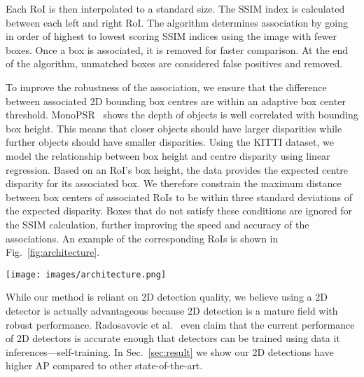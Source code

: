 \documentclass[letterpaper, 10 pt, conference]{ieeeconf}
\begin{document}
Each RoI is then interpolated to a standard size. The SSIM index is calculated between each left and right RoI. The algorithm determines association by going in order of highest to lowest scoring SSIM indices using the image with fewer boxes. Once a box is associated, it is removed for faster comparison. At the end of the algorithm, unmatched boxes are considered false positives and removed.

To improve the robustness of the association, we ensure that the difference between associated 2D bounding box centres are within an adaptive box center threshold. MonoPSR~\cite{ku2019monopsr} shows the depth of objects is well correlated with bounding box height. This means that closer objects should have larger disparities while further objects should have smaller disparities. Using the KITTI dataset, we model the relationship between box height and centre disparity using linear regression. Based on an RoI's box height, the data provides the expected centre disparity for its associated box. We therefore constrain the maximum distance between box centers of associated RoIs to be within three standard deviations of the expected disparity. Boxes that do not satisfy these conditions are ignored for the SSIM calculation, further improving the speed and accuracy of the associations. An example of the corresponding RoIs is shown in Fig.~\ref{fig:architecture}.

\begin{figure*}[t!]
	\begin{center}
		\texttt{[image: images/architecture.png]}
	\end{center}
	\caption{A 2D detector and box association algorithm determine associated RoIs. Our stereo matching network estimates disparities with a 3D CNN and soft argmin operation~\cite{chang2018psmnet} for object pixels using the RoIs and instance segmentation. These are converted to a 3D point cloud and can be inputted to any LiDAR-based 3D object detector. X indicates multiplication.}
	\label{fig:architecture}
\end{figure*}

While our method is reliant on 2D detection quality, we believe using a 2D detector is actually advantageous because 2D detection is a mature field with robust performance. Radosavovic et al.~\cite{data_distillation_radosavovic} even claim that the current performance of 2D detectors is accurate enough that detectors can be trained using data it inferences---self-training. In Sec.~\ref{sec:result} we show our 2D detections have higher AP compared to other state-of-the-art.
\end{document}
